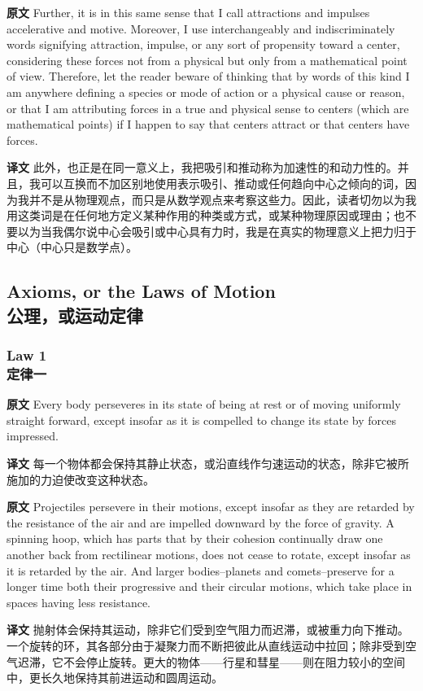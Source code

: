 \documentclass[UTF8,zihao=-4]{ctexart}
\begin{document}
\noindent\textbf{原文} Further, it is in this same sense that I call attractions and impulses accelerative and motive. Moreover, I use interchangeably and indiscriminately words signifying attraction, impulse, or any sort of propensity toward a center, considering these forces not from a physical but only from a mathematical point of view. Therefore, let the reader beware of thinking that by words of this kind I am anywhere defining a species or mode of action or a physical cause or reason, or that I am attributing forces in a true and physical sense to centers (which are mathematical points) if I happen to say that centers attract or that centers have forces.
\par\noindent\textbf{译文} 此外，也正是在同一意义上，我把吸引和推动称为加速性的和动力性的。并且，我可以互换而不加区别地使用表示吸引、推动或任何趋向中心之倾向的词，因为我并不是从物理观点，而只是从数学观点来考察这些力。因此，读者切勿以为我用这类词是在任何地方定义某种作用的种类或方式，或某种物理原因或理由；也不要以为当我偶尔说中心会吸引或中心具有力时，我是在真实的物理意义上把力归于中心（中心只是数学点）。
\medskip

\subsection*{Axioms, or the Laws of Motion\\公理，或运动定律}

\subsubsection*{Law 1\\定律一}
\noindent\textbf{原文} Every body perseveres in its state of being at rest or of moving uniformly straight forward, except insofar as it is compelled to change its state by forces impressed.
\par\noindent\textbf{译文} 每一个物体都会保持其静止状态，或沿直线作匀速运动的状态，除非它被所施加的力迫使改变这种状态。
\medskip

\noindent\textbf{原文} Projectiles persevere in their motions, except insofar as they are retarded by the resistance of the air and are impelled downward by the force of gravity. A spinning hoop, which has parts that by their cohesion continually draw one another back from rectilinear motions, does not cease to rotate, except insofar as it is retarded by the air. And larger bodies--planets and comets--preserve for a longer time both their progressive and their circular motions, which take place in spaces having less resistance.
\par\noindent\textbf{译文} 抛射体会保持其运动，除非它们受到空气阻力而迟滞，或被重力向下推动。一个旋转的环，其各部分由于凝聚力而不断把彼此从直线运动中拉回；除非受到空气迟滞，它不会停止旋转。更大的物体——行星和彗星——则在阻力较小的空间中，更长久地保持其前进运动和圆周运动。
\medskip
\end{document}
